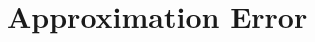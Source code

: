 \documentclass[12pt,a4paper]{article}\usepackage[]{graphicx}\usepackage[]{color}
\begin{document}
\begin{comment}
In the UVB case, if the marginal information about $\theta$ contained in data from $T_n$ to $T_{n+1}$ is relatively small, the converged $\lambda_{n+1}$ will not be significantly different from $\lambda_n$ and importance sampler weight decay is avoided.
\\

The variance of this estimator is increased relative to the score gradient estimator in (\ref{scoreDeriv}) due to the presence of the importance sampling weights. This increased variance can resulting in less accurate approximations, as the algorithm stopping criteria, a sufficiently small value of $|\mathcal{L}(q, \lambda^{(m+1)}) - \mathcal{L}(q, \lambda^{(m)})|$ after iteration $m+1$ is only evaluated as a noisy estimate also using the importance sampler. As the computation per iteration is extremely small we can set $N$ to be very large to compensate, allowing the user to set the trade-off between computation time approximation accuracy to suit their requirements.
\\

IS-UVB is outlined in Algorithm \ref{alg:UVBIS}.
\\

\vspace{2mm}
\begin{algorithm}[H]
 \SetKwInOut{Input}{Input}
 \Input{Prior, Likelihood.}
 \KwResult{Approximating distribution at $T_N$.}
 Observe $y_{1:T_1}$\;
 Use (\ref{scoreDeriv}) to choose the $\lambda_1$ that minimises $KL[q_{\lambda_1}(\theta |y_{1:T_1})\hspace{.1cm}||\hspace{.1cm}p(\theta |y_{1:T_1})]$\;
 \For{$n \mbox{ in } 1, \ldots, N-1$}{
    Observe $y_{T_{n}+1:T_{n+1}}$\;
   Sample $\theta \sim q_{\lambda_{n}}(\theta | y_{1:T_{n}})$\; 
   Calculate $p(y_{T_{n}+1:T_{n+1}} | \theta)$ and $q_{\lambda_{n}}(\theta | y_{1:T_{n}})$ for these samples\;
  Use (\ref{UVBIS:scoreEstIS}) to choose the $\lambda_{n+1}$ that minimises $KL[q_{\lambda_{n+1}}(\theta |y_{1:T_{n+1}})\hspace{.1cm}||\hspace{.1cm}\hat{p}(\theta |y_{1:T_{n+1}})]$
  }
 \caption{Importance Sampled UVB}
  \label{alg:UVBIS}
\end{algorithm}


\end{comment}
\iffalse
\section{Approximation Error}
\end{document}
